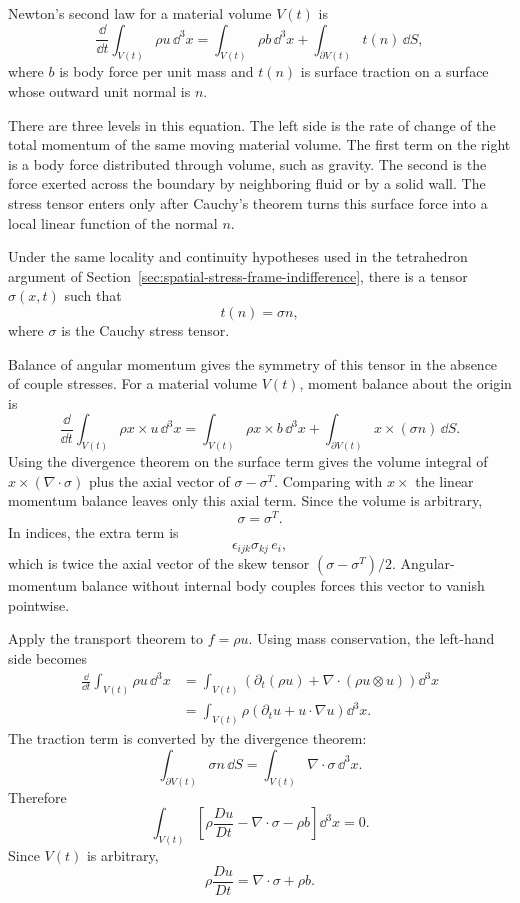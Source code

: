 Newton's second law for a material volume \(V(t)\) is
\[
  \frac{\dd}{\dd t}\int_{V(t)}\rho u\,\dd^3x
  =
  \int_{V(t)}\rho b\,\dd^3x
  +
  \int_{\partial V(t)} t(n)\,\dd S,
\]
where \(b\) is body force per unit mass and \(t(n)\) is surface traction on a
surface whose outward unit normal is \(n\).

There are three levels in this equation.  The left side is the rate of change
of the total momentum of the same moving material volume.  The first term on
the right is a body force distributed through volume, such as gravity.  The
second is the force exerted across the boundary by neighboring fluid or by a
solid wall.  The stress tensor enters only after Cauchy's theorem turns this
surface force into a local linear function of the normal \(n\).

\begin{proposition}
Under the same locality and continuity hypotheses used in the tetrahedron
argument of Section~\ref{sec:spatial-stress-frame-indifference}, there is a
tensor \(\sigma(x,t)\) such that
\[
  t(n)=\sigma n,
\]
where \(\sigma\) is the Cauchy stress tensor.
\end{proposition}

Balance of angular momentum gives the symmetry of this tensor in the absence of
couple stresses. For a material volume \(V(t)\), moment balance about the
origin is
\[
  \frac{\dd}{\dd t}\int_{V(t)} \rho x\times u\,\dd^3x
  =
  \int_{V(t)} \rho x\times b\,\dd^3x
  +
  \int_{\partial V(t)} x\times(\sigma n)\,\dd S.
\]
Using the divergence theorem on the surface term gives the volume integral of
\(x\times(\nabla\cdot\sigma)\) plus the axial vector of
\(\sigma-\sigma^T\). Comparing with \(x\times\) the linear momentum balance
leaves only this axial term. Since the volume is arbitrary,
\[
  \sigma=\sigma^T.
\]
In indices, the extra term is
\[
  \epsilon_{ijk}\sigma_{kj}\,e_i,
\]
which is twice the axial vector of the skew tensor
\((\sigma-\sigma^T)/2\). Angular-momentum balance without internal body
couples forces this vector to vanish pointwise.

\begin{derivation}
Apply the transport theorem to \(f=\rho u\). Using mass conservation, the
left-hand side becomes
\[
\begin{aligned}
  \frac{\dd}{\dd t}\int_{V(t)}\rho u\,\dd^3x
  &=
  \int_{V(t)}
  \left(
    \partial_t(\rho u)+\nabla\cdot(\rho u\otimes u)
  \right)\dd^3x\\
  &=
  \int_{V(t)}
  \rho\left(\partial_tu+u\cdot\nabla u\right)\dd^3x.
\end{aligned}
\]
The traction term is converted by the divergence theorem:
\[
  \int_{\partial V(t)}\sigma n\,\dd S
  =
  \int_{V(t)}\nabla\cdot\sigma\,\dd^3x.
\]
Therefore
\[
  \int_{V(t)}
  \left[
    \rho\frac{D u}{D t}
    -
    \nabla\cdot\sigma
    -
    \rho b
  \right]\dd^3x=0.
\]
Since \(V(t)\) is arbitrary,
\[
  \boxed{
  \rho\frac{D u}{D t}=\nabla\cdot\sigma+\rho b.
  }
\]
\end{derivation}

